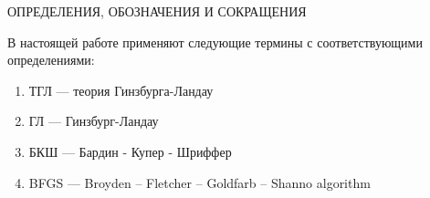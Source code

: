 \begin{center}
	ОПРЕДЕЛЕНИЯ, ОБОЗНАЧЕНИЯ И СОКРАЩЕНИЯ
\end{center}

В настоящей работе применяют следующие термины с соответствующими определениями:
\begin{enumerate}
    \item ТГЛ --- теория Гинзбурга-Ландау
    \item ГЛ --- Гинзбург-Ландау
    \item БКШ --- Бардин - Купер - Шриффер
    \item BFGS --- Broyden -- Fletcher -- Goldfarb -- Shanno algorithm
\end{enumerate}

\newpage